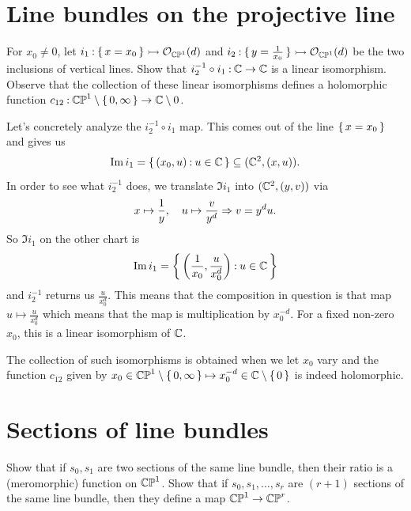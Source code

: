 \documentclass[12pt]{memoir}
\begin{document}
\section{Line bundles on the projective line}

\begin{Ej}
    For $x_0\neq 0$, let $i_1\mathbin{:}\{\,x=x_0\,\}\rightarrowtail\mathcal{O}_{\mathbb{CP}^1}(d)$ and $i_2\mathbin{:}\{\,y=\frac{1}{x_0}\,\}\rightarrowtail\mathcal{O}_{\mathbb{CP}^1}(d)$ be the two inclusions of vertical lines. Show that $i_2^{-1}\circ i_1\mathbin{:}\mathbb{C}\to\mathbb{C}$ is a linear isomorphism. Observe that the collection of these linear isomorphisms defines a holomorphic function $c_{12}\mathbin{:}\mathbb{CP}^1\setminus\{\,0,\infty\,\}\to\mathbb{C}\setminus 0$.
\end{Ej}

\begin{ptcbr}
    Let's concretely analyze the $i_2^{-1}\circ i_1$ map. This comes out of the line $\{\,x=x_0\,\}$ and gives us 
    $$\Im i_1=\{\,(x_0,u)\mathbin{:} u\in\mathbb{C}\,\}\subseteq (\mathbb{C}^2,(x,u)).$$
    In order to see what $i_2^{-1}$ does, we translate $\Im i_1$ into $(\mathbb{C}^2,(y,v))$ via
    $$x\mapsto \frac{1}{y},\quad u\mapsto\frac{v}{y^d}\Rightarrow v=y^du.$$
    So $\Im i_1$ on the other chart is 
    $$\Im i_1=\biggl\{\,\left(\frac{1}{x_0},\frac{u}{x_0^d}\right)\mathbin{:} u\in\mathbb{C}\,\biggr\}$$
    and $i_2^{-1}$ returns us $\frac{u}{x_0^d}$. This means that the composition in question is that map $u\mapsto \frac{u}{x_0^d}$ which means that the map is multiplication by $x_0^{-d}$. For a fixed non-zero $x_0$, this is a linear isomorphism of $\mathbb{C}$.\par
    The collection of such isomorphisms is obtained when we let $x_0$ vary and the function $c_{12}$ given by $x_0\in\mathbb{CP}^{1}\setminus\{\,0,\infty\,\}\mapsto x_0^{-d}\in\mathbb{C}\setminus\{\,0\,\}$ is indeed holomorphic.
\end{ptcbr}
\section{Sections of line bundles}

\begin{Ej}
    Show that if $s_0,s_1$ are two sections of the same line bundle, then their ratio is a (meromorphic) function on $\mathbb{CP}^1$. Show that if $s_0,s_1,\dots,s_r$
 are $(r+1)$ sections of the same line bundle, then they define a map $\mathbb{CP}^1\to\mathbb{CP}^r$.
\end{Ej}
\end{document}
